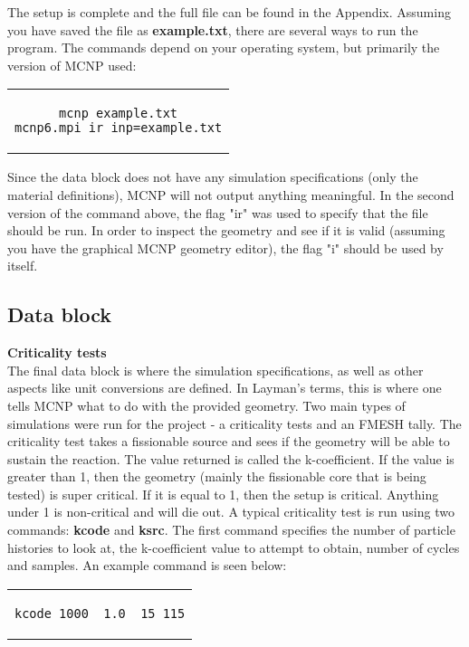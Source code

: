 The setup is complete and the full file can be found in the Appendix. Assuming you have saved the file as \textbf{example.txt}, there are several ways to run the program. The commands depend on your operating system, but primarily the version of MCNP used:

\begin{center}
\begin{tabular}{c}
\begin{lstlisting}
mcnp example.txt
mcnp6.mpi ir inp=example.txt
\end{lstlisting}
\end{tabular}
\end{center}

Since the data block does not have any simulation specifications (only the material definitions), MCNP will not output anything meaningful. In the second version of the command above, the flag "ir" was used to specify that the file should be run. In order to inspect the geometry and see if it is valid (assuming you have the graphical MCNP geometry editor), the flag "i" should be used by itself.

\label{sec:simulations}
\subsection{Data block}

\textbf{Criticality tests}\\

The final data block is where the simulation specifications, as well as other aspects like unit conversions are defined. In Layman's terms, this is where one tells MCNP what to do with the provided geometry. Two main types of simulations were run for the project - a criticality tests and an FMESH tally. The criticality test takes a fissionable source and sees if the geometry will be able to sustain the reaction. The value returned is called the k-coefficient. If the value is greater than 1, then the geometry (mainly the fissionable core that is being tested) is super critical. If it is equal to 1, then the setup is critical. Anything under 1 is non-critical and will die out. A typical criticality test is run using two commands: \textbf{kcode} and \textbf{ksrc}. The first command specifies the number of particle histories to look at, the k-coefficient value to attempt to obtain, number of cycles and samples. An example command is seen below:

\begin{center}
\begin{tabular}{c}
\begin{lstlisting}
kcode 1000  1.0  15 115
\end{lstlisting}
\end{tabular}
\end{center}


